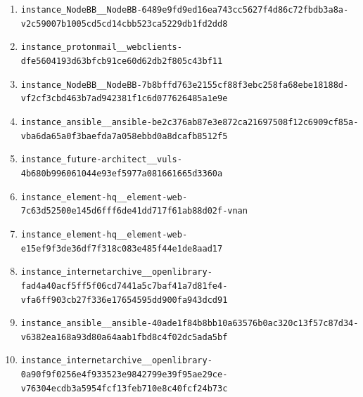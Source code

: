 \begin{enumerate}
\item \texttt{instance\_\allowbreak{}NodeBB\_\allowbreak{}\_\allowbreak{}NodeBB-\allowbreak{}6489e9fd9ed16e\allowbreak{}a743cc5627f4d8\allowbreak{}6c72fbdb3a8a-\allowbreak{}v2c59007b1005c\allowbreak{}d5cd14cbb523ca\allowbreak{}5229db1fd2dd8}
\item \texttt{instance\_\allowbreak{}protonmail\_\allowbreak{}\_\allowbreak{}webclients-\allowbreak{}dfe5604193d63b\allowbreak{}fcb91ce60d62db\allowbreak{}2f805c43bf11}
\item \texttt{instance\_\allowbreak{}NodeBB\_\allowbreak{}\_\allowbreak{}NodeBB-\allowbreak{}7b8bffd763e215\allowbreak{}5cf88f3ebc258f\allowbreak{}a68ebe18188d-\allowbreak{}vf2cf3cbd463b7\allowbreak{}ad942381f1c6d0\allowbreak{}77626485a1e9e}
\item \texttt{instance\_\allowbreak{}ansible\_\allowbreak{}\_\allowbreak{}ansible-\allowbreak{}be2c376ab87e3e\allowbreak{}872ca21697508f\allowbreak{}12c6909cf85a-\allowbreak{}vba6da65a0f3ba\allowbreak{}efda7a058ebbd0\allowbreak{}a8dcafb8512f5}
\item \texttt{instance\_\allowbreak{}future-\allowbreak{}architect\_\allowbreak{}\_\allowbreak{}vuls-\allowbreak{}4b680b99606104\allowbreak{}4e93ef5977a081\allowbreak{}661665d3360a}
\item \texttt{instance\_\allowbreak{}element-\allowbreak{}hq\_\allowbreak{}\_\allowbreak{}element-\allowbreak{}web-\allowbreak{}7c63d52500e145\allowbreak{}d6fff6de41dd71\allowbreak{}7f61ab88d02f-\allowbreak{}vnan}
\item \texttt{instance\_\allowbreak{}element-\allowbreak{}hq\_\allowbreak{}\_\allowbreak{}element-\allowbreak{}web-\allowbreak{}e15ef9f3de36df\allowbreak{}7f318c083e485f\allowbreak{}44e1de8aad17}
\item \texttt{instance\_\allowbreak{}internetarchiv\allowbreak{}e\_\allowbreak{}\_\allowbreak{}openlibrary-\allowbreak{}fad4a40acf5ff5\allowbreak{}f06cd7441a5c7b\allowbreak{}af41a7d81fe4-\allowbreak{}vfa6ff903cb27f\allowbreak{}336e17654595dd\allowbreak{}900fa943dcd91}
\item \texttt{instance\_\allowbreak{}ansible\_\allowbreak{}\_\allowbreak{}ansible-\allowbreak{}40ade1f84b8bb1\allowbreak{}0a63576b0ac320\allowbreak{}c13f57c87d34-\allowbreak{}v6382ea168a93d\allowbreak{}80a64aab1fbd8c\allowbreak{}4f02dc5ada5bf}
\item \texttt{instance\_\allowbreak{}internetarchiv\allowbreak{}e\_\allowbreak{}\_\allowbreak{}openlibrary-\allowbreak{}0a90f9f0256e4f\allowbreak{}933523e9842799\allowbreak{}e39f95ae29ce-\allowbreak{}v76304ecdb3a59\allowbreak{}54fcf13feb710e\allowbreak{}8c40fcf24b73c}

\end{enumerate}
